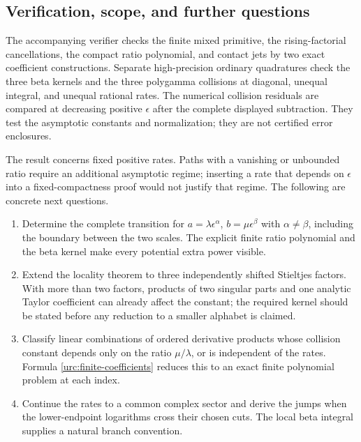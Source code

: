 \subsection{Verification, scope, and further questions}

The accompanying verifier checks the finite mixed primitive,
the rising-factorial cancellations, the compact ratio polynomial,
and contact jets by two exact coefficient constructions. Separate
high-precision ordinary quadratures check the three beta kernels
and the three polygamma collisions at diagonal, unequal integral,
and unequal rational rates. The numerical collision residuals are
compared at decreasing positive $\epsilon$ after the complete
displayed subtraction. They test the asymptotic constants and
normalization; they are not certified error enclosures.

The result concerns fixed positive rates. Paths with a vanishing or
unbounded ratio require an additional asymptotic regime; inserting
a rate that depends on $\epsilon$ into a fixed-compactness proof
would not justify that regime. The following are concrete next
questions.
\begin{enumerate}
\item Determine the complete transition for
$a=\lambda\epsilon^\alpha$, $b=\mu\epsilon^\beta$ with
$\alpha\ne\beta$, including the boundary between the two
scales. The explicit finite ratio polynomial and the beta kernel
make every potential extra power visible.
\item Extend the locality theorem to three independently shifted
Stieltjes factors. With more than two factors, products of two
singular parts and one analytic Taylor coefficient can already
affect the constant; the required kernel should be stated before
any reduction to a smaller alphabet is claimed.
\item Classify linear combinations of ordered derivative products
whose collision constant depends only on the ratio $\mu/\lambda$,
or is independent of the rates. Formula \eqref{urc:finite-coefficients}
reduces this to an exact finite polynomial problem at each index.
\item Continue the rates to a common complex sector and derive
the jumps when the lower-endpoint logarithms cross their chosen
cuts. The local beta integral supplies a natural branch convention.
\end{enumerate}
